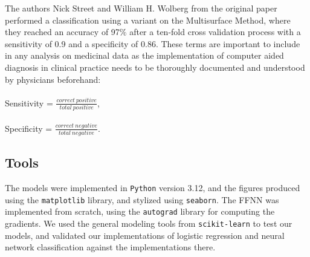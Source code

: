 The authors Nick Street and William H. Wolberg from the original paper performed a classification using a variant on the Multisurface 
Method, where they reached an accuracy of 97$\%$ after a ten-fold cross validation process with a sensitivity of 0.9 and a specificity of 0.86. 
These terms are important to include in any analysis on medicinal data as the implementation of computer aided diagnosis in clinical practice 
needs to be thoroughly documented and understood by physicians beforehand: 
\\
\\
Sensitivity = $\frac{correct\ positive}{total\ positive}$,
\\
\\
Specificity = $\frac{correct\ negative}{total\ negative}$.
%
\subsection{Tools}\label{ssec:tools}
The models were implemented in \verb|Python| version 3.12, and the figures produced using the \verb|matplotlib| library, 
and stylized using \verb|seaborn|. The FFNN was implemented from scratch, using the \verb|autograd| library \cite{maclaurin2015:autograd} 
for computing the gradients. We used the general modeling tools from \verb|scikit-learn| \cite{scikit-learn} to test our models, and validated our implementations of logistic regression and neural network classification against the implementations there.